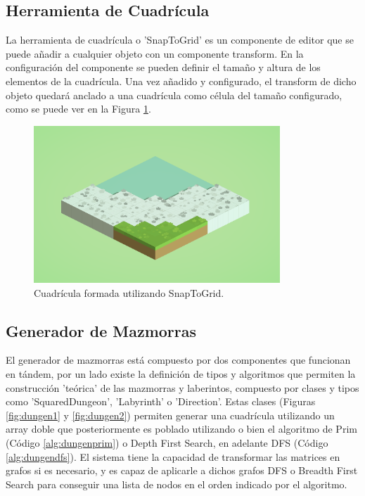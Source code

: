 \subsection{Herramienta de Cuadrícula}
La herramienta de cuadrícula o 'SnapToGrid' es un componente de editor que se puede añadir a cualquier objeto con un componente transform. En la configuración del componente
 se pueden definir el tamaño y altura de los elementos de la cuadrícula. Una vez añadido y configurado, el transform de dicho objeto quedará anclado a una cuadrícula como 
 célula del tamaño configurado, como se puede ver en la Figura \ref{fig:snaptogrid}.

 \begin{figure}[H]
  \centering
    \includegraphics[width=350px,clip=true]{snaptogrid.png}
  \caption{Cuadrícula formada utilizando SnapToGrid.}
  \label{fig:snaptogrid}
\end{figure}

\subsection{Generador de Mazmorras}
El generador de mazmorras está compuesto por dos componentes  que funcionan en tándem, por un lado existe la definición de tipos y algoritmos que permiten la construcción 
'teórica' de las mazmorras y laberintos, compuesto por clases y tipos como 'SquaredDungeon', 'Labyrinth' o 'Direction'. Estas clases (Figuras \ref{fig:dungen1} y \ref{fig:dungen2}) permiten generar una cuadrícula utilizando 
un array doble que posteriormente es poblado utilizando o bien el algoritmo de Prim (Código \ref{alg:dungenprim}) o Depth First Search, en adelante DFS (Código \ref{alg:dungendfs}). El sistema tiene la capacidad de transformar las matrices en grafos si es necesario, y es capaz de aplicarle a dichos grafos 
DFS o Breadth First Search para conseguir una lista de nodos en el orden indicado por el algoritmo.  

